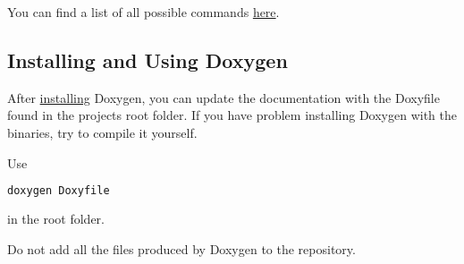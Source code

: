 You can find a list of all possible commands \href{http://www.stack.nl/~dimitri/doxygen/manual/commands.html}{here}.

\subsection{Installing and Using Doxygen}
\label{subsec:Doxygen}

After \href{http://www.stack.nl/~dimitri/doxygen/download.html}{installing} Doxygen, you can update the documentation with the Doxyfile found in the projects root folder. If you have problem installing Doxygen with the binaries, try to compile it yourself. 

Use
\begin{lstlisting}[language=bash, numbers=none]
	doxygen Doxyfile
\end{lstlisting}
in the root folder.

\begin{mdframed}
Do not add all the files produced by Doxygen to the repository.
\end{mdframed}